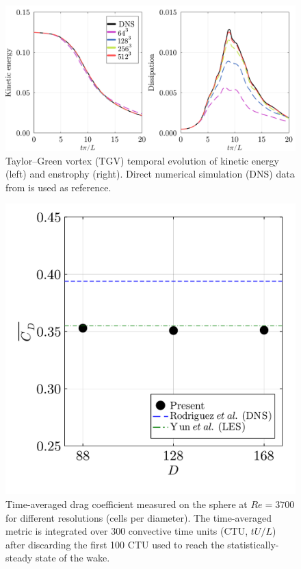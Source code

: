\documentclass[10pt,a4paper]{article}
\begin{document}
\begin{figure}[!t]
    \centering
    \includegraphics[width=0.7\linewidth]{img/tgv_validation.pdf}
	\caption{Taylor--Green vortex (TGV) temporal evolution of kinetic energy (left) and enstrophy (right). Direct numerical simulation (DNS) data from \cite{Dairay2017} is used as reference.}
	\label{fig:tgv_val}
\end{figure}

\begin{figure}[!t]
  \centering
  \includegraphics[width=0.4\linewidth]{img/sphere_validation.pdf}
  \vspace*{-0.5cm}
  \caption{Time-averaged drag coefficient measured on the sphere at $Re=3700$ for different resolutions (cells per diameter). The time-averaged metric is integrated over 300 convective time units (CTU, $tU/L$) after discarding the first 100 CTU used to reach the statistically-steady state of the wake.}
  \label{fig:sphere_val}
\end{figure}
\end{document}
